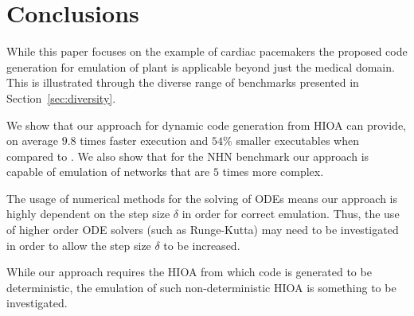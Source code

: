 \section{Conclusions}

While this paper focuses on the example of cardiac pacemakers the proposed code generation for emulation of plant is applicable beyond just the medical domain.
This is illustrated through the diverse range of benchmarks presented in Section~\ref{sec:diversity}.

We show that our approach for dynamic code generation from \ac{HIOA} can 
provide, on average $9.8$ times faster execution and $54\%$ smaller executables 
when compared to \simulink.
We also show that for the \acf{NHN} benchmark our approach is capable of 
emulation of networks that are $5$ times more complex.

The usage of numerical methods for the solving of \acp{ODE} means our approach is highly dependent on the step size $\delta$ in order for correct emulation.
Thus, the use of higher order \ac{ODE} solvers (such as Runge-Kutta) may need to be investigated in order to allow the step size $\delta$ to be increased.

While our approach requires the \ac{HIOA} from which code is generated to be 
deterministic, the emulation of such non-deterministic \ac{HIOA} is something 
to be investigated.
